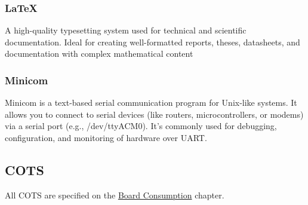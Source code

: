 \subsubsection{\LaTeX}
A high-quality typesetting system used for technical and scientific documentation. Ideal for creating well-formatted reports, theses, datasheets, and documentation with complex mathematical content
\subsubsection{Minicom}
Minicom is a text-based serial communication program for Unix-like systems. It allows you to connect to serial devices (like routers, microcontrollers, or modems) via a serial port (e.g., /dev/ttyACM0). It's commonly used for debugging, configuration, and monitoring of hardware over UART.
\subsection{COTS}
All COTS are specified on the \hyperref[link:Board Consumption]{Board Consumption} chapter.

